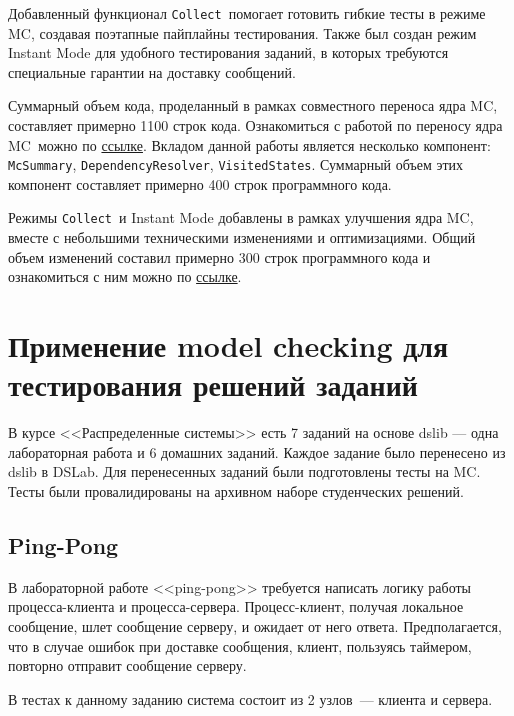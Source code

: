\documentclass[a4paper,12pt]{extarticle}
\newcommand{\collect}[0]{\texttt{Collect}}
\newcommand{\mc}[0]{MC}
\begin{document}
Добавленный функционал \collect\ помогает готовить гибкие тесты в режиме \mc, создавая поэтапные пайплайны тестирования.
Также был создан режим Instant Mode для удобного тестирования заданий, в которых требуются специальные гарантии на доставку сообщений.

Суммарный объем кода, проделанный в рамках совместного переноса ядра \mc, составляет примерно 1100 строк кода.
Ознакомиться с работой по переносу ядра \mc\ можно по \href{https://github.com/osukhoroslov/dslab/pull/172}{ссылке}.
Вкладом данной работы является несколько компонент: \texttt{McSummary}, \texttt{DependencyResolver}, \texttt{VisitedStates}.
Суммарный объем этих компонент составляет примерно 400 строк программного кода.

Режимы \collect\ и Instant Mode добавлены в рамках улучшения ядра \mc, вместе с небольшими техническими изменениями и оптимизациями.
Общий объем изменений составил примерно 300 строк программного кода и ознакомиться с ним можно по \href{https://github.com/KiK0S/dslab/pull/12}{ссылке}.  

\section{Применение model checking для тестирования решений заданий}
\label{CHAPTER4}

В курсе <<Распределенные системы>> есть 7 заданий на основе dslib --- одна лабораторная работа и 6 домашних заданий.
Каждое задание было перенесено из dslib \cite{b11} в DSLab.
Для перенесенных заданий были подготовлены тесты на \mc.
Тесты были провалидированы на архивном наборе студенческих решений. 

\subsection{Ping-Pong}

В лабораторной работе <<ping-pong>> \cite{b28} требуется написать логику работы процесса-клиента и процесса-сервера.
Процесс-клиент, получая локальное сообщение, шлет сообщение серверу, и ожидает от него ответа.
Предполагается, что в случае ошибок при доставке сообщения, клиент, пользуясь таймером, повторно отправит сообщение серверу.

В тестах к данному заданию система состоит из 2 узлов~--- клиента и сервера.
\end{document}
